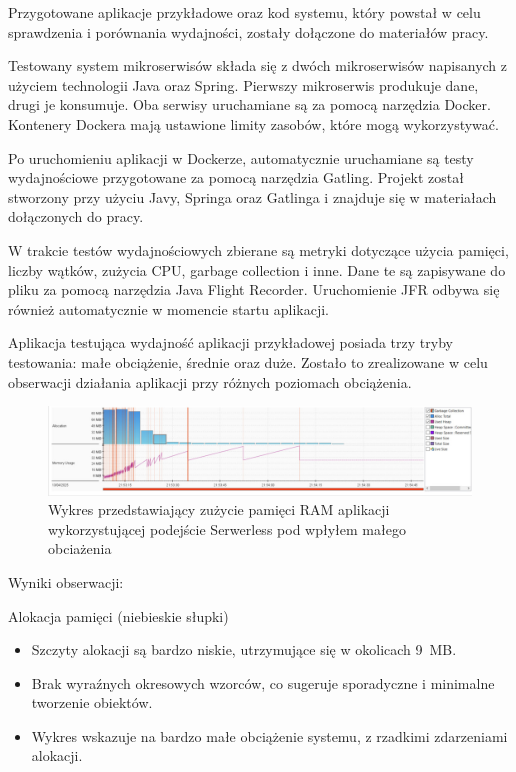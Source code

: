 \documentclass[runningheads,12pt]{llncs}
\begin{document}
Przygotowane aplikacje przykładowe oraz kod systemu, który powstał w celu sprawdzenia i porównania wydajności, zostały dołączone do materiałów pracy.

Testowany system mikroserwisów składa się z dwóch mikroserwisów napisanych z użyciem technologii Java oraz Spring. Pierwszy mikroserwis produkuje dane, drugi je konsumuje. Oba serwisy uruchamiane są za pomocą narzędzia Docker. Kontenery Dockera mają ustawione limity zasobów, które mogą wykorzystywać.

Po uruchomieniu aplikacji w Dockerze, automatycznie uruchamiane są testy wydajnościowe przygotowane za pomocą narzędzia Gatling. Projekt został stworzony przy użyciu Javy, Springa oraz Gatlinga i znajduje się w materiałach dołączonych do pracy.

W trakcie testów wydajnościowych zbierane są metryki dotyczące użycia pamięci, liczby wątków, zużycia CPU, garbage collection i inne. Dane te są zapisywane do pliku za pomocą narzędzia Java Flight Recorder. Uruchomienie JFR odbywa się również automatycznie w momencie startu aplikacji.

Aplikacja testująca wydajność aplikacji przykładowej posiada trzy tryby testowania: małe obciążenie, średnie oraz duże. Zostało to zrealizowane w celu obserwacji działania aplikacji przy różnych poziomach obciążenia.

\newpage

\begin{figure}
    \includegraphics[width=\linewidth]{images/serverless-memory-low-graph.jpg}
    \caption{Wykres przedstawiający zużycie pamięci  RAM aplikacji wykorzystującej podejście Serwerless pod wpłyłem małego obciażenia} \label{fig1}
\end{figure}

Wyniki obserwacji:

Alokacja pamięci (niebieskie słupki)

\begin{itemize}
    \item Szczyty alokacji są bardzo niskie, utrzymujące się w okolicach 9~MB.
    \item Brak wyraźnych okresowych wzorców, co sugeruje sporadyczne i minimalne tworzenie obiektów.
    \item Wykres wskazuje na bardzo małe obciążenie systemu, z rzadkimi zdarzeniami alokacji.
\end{itemize}
\end{document}
